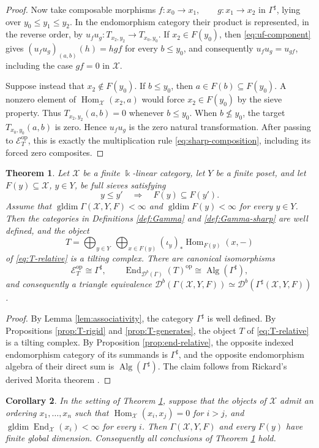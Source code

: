 \documentclass[12pt,a4paper,english,reqno]{amsart}
\theoremstyle{plain}
\newtheorem{theorem}{Theorem}[section]
\newtheorem{corollary}[theorem]{Corollary}
\theoremstyle{definition}
\newcommand{\kk}{\Bbbk}
\newcommand{\Hom}{\operatorname{Hom}}
\newcommand{\End}{\operatorname{End}}
\newcommand{\gldim}{\operatorname{gldim}}
\newcommand{\op}{\mathrm{op}}
\newcommand{\X}{\mathcal X}
\newcommand{\G}{\Gamma}
\newcommand{\Gs}{\Gamma^{\sharp}}
\newcommand{\Db}[1]{{\mathscr D}^b(#1)}
\begin{document}
\begin{proof}
Now take composable morphisms $f:x_0\longrightarrow x_1,\qquad
 g:x_1\longrightarrow x_2$
in $\Gs$, lying over $y_0\leq y_1\leq y_2$.  In the endomorphism
category their product is represented, in the reverse order, by
$u_f u_g:T_{x_2,y_2}\longrightarrow T_{x_0,y_0}$.
If $x_2\in F(y_0)$, then \eqref{eq:uf-component} gives $(u_fu_g)_{(a,b)}(h)=hgf$
for every $b\leq y_0$, and consequently $u_fu_g=u_{gf}$, including the
case $gf=0$ in $\X$.

Suppose instead that $x_2\notin F(y_0)$.  If $b\leq y_0$, then
$a\in F(b)\subseteq F(y_0)$.  A nonzero element of
$\Hom_{\X}(x_2,a)$ would force $x_2\in F(y_0)$ by the sieve property.
Thus $T_{x_2,y_2}(a,b)=0$ whenever $b\leq y_0$.  When
$b\nleq y_0$, the target $T_{x_0,y_0}(a,b)$ is zero.  Hence
$u_fu_g$ is the zero natural transformation. After passing to
$\mathcal E_T^{\op}$, this is exactly the multiplication rule
\eqref{eq:sharp-composition}, including its forced zero composites.
\end{proof}

\begin{theorem}
\label{thm:relative}
Let $\X$ be a finite $\kk$-linear category, let $Y$ be a finite
poset, and let
$F(y)\subseteq\X$, $y\in Y$, be full sieves satisfying
\[
 y\leq y'\quad\Longrightarrow\quad F(y)\subseteq F(y').
\]
Assume that $\gldim\G(\X,Y,F)<\infty$ and $\gldim F(y)<\infty$ for every $y\in Y$.
Then the categories in Definitions \ref{def:Gamma} and \ref{def:Gamma-sharp} are well defined,
and the object
\[
 T=\bigoplus_{y\in Y}\ \bigoplus_{x\in F(y)}
 (\iota_y)_*\Hom_{F(y)}(x,-)
\]
of \eqref{eq:T-relative} is a tilting complex. There are canonical
isomorphisms
\[
 \mathcal E_T^{\op}\cong\Gs,
 \qquad
 \End_{\Db{\G}}(T)^{\op}
 \cong\operatorname{Alg}(\Gs),
\]
and consequently a triangle equivalence $\Db{\G(\X,Y,F)}\simeq\Db{\Gs(\X,Y,F)}$.
\end{theorem}

\begin{proof}
By Lemma \ref{lem:associativity}, the category $\Gs$ is well defined.  By
Propositions \ref{prop:T-rigid} and \ref{prop:T-generates}, the object $T$ of
\eqref{eq:T-relative} is a tilting complex. By
Proposition \ref{prop:end-relative}, the opposite indexed endomorphism
category of its summands is $\Gs$, and the opposite endomorphism algebra of
their direct sum is $\operatorname{Alg}(\Gs)$.
The claim follows from Rickard's derived Morita theorem
\cite{Rickard1989}.
\end{proof}

\begin{corollary}
\label{cor:directed-relative}
In the setting of Theorem \ref{thm:relative}, suppose that the objects of $\X$
admit an ordering $x_1,\ldots,x_n$ such that $\Hom_{\X}(x_i,x_j)=0$ for $i>j$,
and $\gldim\End_{\X}(x_i)<\infty$ for every $i$.
Then $\G(\X,Y,F)$ and every $F(y)$ have finite global dimension.
Consequently all conclusions of Theorem \ref{thm:relative} hold.
\end{corollary}
\end{document}
